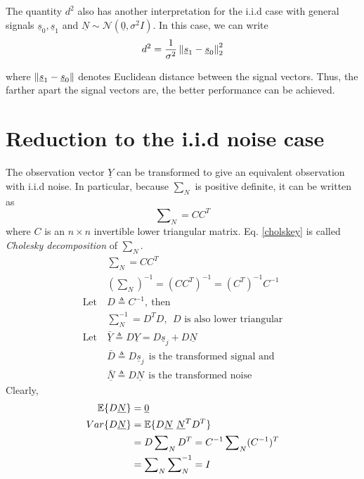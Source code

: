 \documentclass[a4paper,english,12pt]{article}
\begin{document}
\begin{note}
The quantity $d^2 $ also has another interpretation for the i.i.d case with general signals $\underline{s}_0, \underline{s}_1$ and $\underline{N} \sim \mathcal{N}(\underline{0}, \sigma^2 I)$. In this case, we can write
$$
d^2=\dfrac{1}{\sigma^2} \left\lVert\underline{s}_1-\underline{s}_0\right\rVert^2_2
$$

\noindent where $\left\lVert\underline{s}_1-\underline{s}_0\right\rVert$ denotes Euclidean distance between the signal vectors. Thus, the farther apart the signal vectors are, the better performance can be achieved.
\end{note}

\section{Reduction to the i.i.d noise case}
The observation vector $\underline{Y}$ can be transformed to give an equivalent observation with i.i.d noise. In particular, because $\sum_N$ is positive definite, it can be written as
\begin{equation}
\sum\nolimits_N = CC^T
\label{cholskey}
\end{equation}
\noindent where $C$ is an $n \times n $ invertible lower triangular matrix. Eq. 
\ref{cholskey} is called \textit{Cholesky decomposition} of $\sum_N$.
\begin{align*}
&\sum\nolimits_N = CC^T\\
&(\sum\nolimits_N)^{-1} = (CC^T)^{-1}=(C^T)^{-1}C^{-1} \\
\mbox{Let} \ &D \triangleq C^{-1}, \ \mbox{then} \\
&\sum\nolimits_N^{-1} = D^TD, \ \ \mbox{$D$ is also lower triangular} \\
\mbox{Let} \  &\underline{\bar{Y}} \triangleq D\underline{Y}=D\underline{s}_j + D\underline{N}\\
&\bar{D} \triangleq D\underline{s}_j \ \ \mbox{is the transformed signal and} \\
&\underline{\bar{N}} \triangleq D\underline{N} \ \ \mbox{is the transformed noise} 
\end{align*}
Clearly,
\begin{align*}
 \mathbb{E} \{D\underline{N}\} &= \underline{0} \\
Var\{D \underline{N}\} &= \mathbb{E} \{ D\underline{N} \ \underline{N}^T D^T \} \\
&=D\sum\nolimits_N D^T = C^{-1} \sum\nolimits_N(C^{-1})^T \\
&=\sum\nolimits_N \sum\nolimits_N^{-1}=I 
\end{align*}
\end{document}
